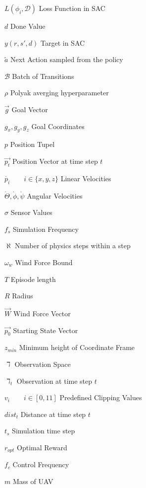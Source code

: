 \documentclass[bachelor,english]{infothesis}
\begin{document}
\begin{description}
	\item $L(\phi_i, \mathcal{D})$ \dotfill Loss Function in SAC
	\item $d$ \dotfill Done Value
	\item $y(r, s', d)$ \dotfill Target in SAC
	\item $\tilde{a}$ \dotfill Next Action sampled from the policy
	\item $\mathcal{B}$ \dotfill Batch of Transitions
	\item $\rho$ \dotfill Polyak averging hyperparameter
	\\
	\item $\overrightarrow{g}$ \dotfill Goal Vector
	\item $g_x, g_y, g_z$ \dotfill Goal Coordinates
	\item $p$ \dotfill Position Tupel
	\item $\overrightarrow{p_t}$ \dotfill Position Vector at time step $t$
	\item $\dot{p_i} \qquad i \in \{x,y,z\}$ \dotfill Linear Velocities
	\item $\dot{\Theta}, \dot{\phi}, \dot{\psi}$ \dotfill Angular Velocities
	\item $\sigma$ \dotfill Sensor Values
	\item $f_s$ \dotfill Simulation Frequency
	\item $\aleph$ \dotfill Number of physics steps within a step
	\item $\omega_w$ \dotfill Wind Force Bound
	\item $T$ \dotfill Episode length
	\item $R$ \dotfill Radius
	\item $\overrightarrow{W}$ \dotfill Wind Force Vector
	\item $\overrightarrow{p_0}$ \dotfill Starting State Vector
	\item $z_{min}$ \dotfill Minimum height of Coordinate Frame
	\item $\daleth$ \dotfill Observation Space
	\item $\daleth_t$ \dotfill Observation at time step $t$
	\item $v_i \qquad i \in [0,11]$ \dotfill Predefined Clipping Values
	\item $dist_t$ \dotfill Distance at time step $t$
	\item $t_s$ \dotfill Simulation time step
	\item $r_{opt}$ \dotfill Optimal Reward
	\item $f_c$ \dotfill Control Frequency
	\item $m$ \dotfill Mass of UAV

\end{description}
\end{document}

